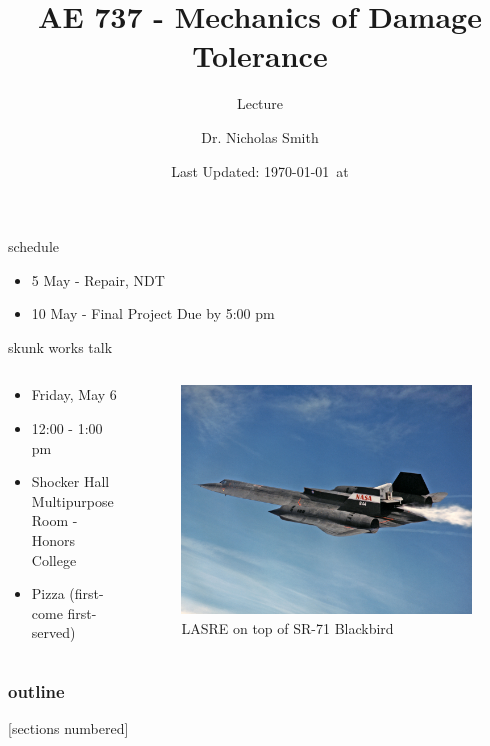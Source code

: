 \documentclass[10pt]{beamer}
\title{AE 737 - Mechanics of Damage Tolerance}
\subtitle{Lecture \arabic{lecture}}
\date{Last Updated: \today\ at \DTMcurrenttime}
\author{Dr. Nicholas Smith}
\institute{Wichita State University, Department of Aerospace Engineering}
\begin{document}
	
	\maketitle
	\begin{frame}{schedule}
		\begin{itemize}
			\item 5 May - Repair, NDT
			\item 10 May - Final Project Due by 5:00 pm
		\end{itemize}
	\end{frame}
	
	\begin{frame}{skunk works talk}
		\begin{columns}
			\begin{column}{0.45\linewidth}
			\begin{itemize}
				\item Friday, May 6
				\item 12:00 - 1:00 pm
				\item Shocker Hall Multipurpose Room - Honors College
				\item Pizza (first-come first-served)
			\end{itemize}
			\end{column}
			\begin{column}{0.45\linewidth}
				\begin{figure}
				\centering
				\includegraphics[width=0.7\linewidth]{../Figures/SR-71_LASRE_cold_test}
				\caption{LASRE on top of SR-71 Blackbird}
				\label{fig:SR-71_LASRE_cold_test}
				\end{figure}
			\end{column}
		\end{columns}
	\end{frame}
	
	\begin{frame}
		\frametitle{outline}
		[sections numbered]
		\tableofcontents[hideallsubsections]
	\end{frame}
\end{document}
